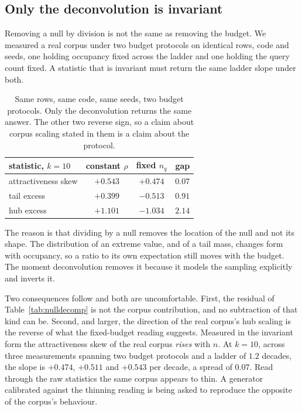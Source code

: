 \documentclass[11pt]{article}
\begin{document}
\subsection{Only the deconvolution is invariant}\label{sec:invariance}

Removing a null by division is not the same as removing the budget. We
measured a real corpus under two budget protocols on identical rows, code and
seeds, one holding occupancy fixed across the ladder and one holding the
query count fixed. A statistic that is invariant must return the same ladder
slope under both.

\begin{table}[t]
\centering
\small
\begin{tabular}{lccc}
\toprule
statistic, $k=10$ & constant $\rho$ & fixed $n_q$ & gap \\
\midrule
attractiveness skew & $+0.543$ & $+0.474$ & $\mathbf{0.07}$ \\
tail excess & $+0.399$ & $-0.513$ & $0.91$ \\
hub excess & $+1.101$ & $-1.034$ & $2.14$ \\
\bottomrule
\end{tabular}
\caption{Same rows, same code, same seeds, two budget protocols. Only the
deconvolution returns the same answer. The other two reverse sign, so a claim
about corpus scaling stated in them is a claim about the protocol.}
\label{tab:invariance}
\end{table}

The reason is that dividing by a null removes the location of the null and
not its shape. The distribution of an extreme value, and of a tail mass,
changes form with occupancy, so a ratio to its own expectation still moves
with the budget. The moment deconvolution removes it because it models the
sampling explicitly and inverts it.

Two consequences follow and both are uncomfortable. First, the residual of
Table~\ref{tab:nulldecomp} is not the corpus contribution, and no
subtraction of that kind can be. Second, and larger, the direction of the
real corpus's hub scaling is the reverse of what the fixed-budget reading
suggests. Measured in the invariant form the attractiveness skew of the real
corpus \emph{rises} with $n$. At $k = 10$, across three measurements
spanning two budget protocols and a ladder of $1.2$ decades, the slope is
$+0.474$, $+0.511$ and $+0.543$ per decade, a spread of $0.07$. Read through
the raw statistics the same corpus appears to thin. A generator calibrated
against the thinning reading is being asked to reproduce the opposite of the
corpus's behaviour.
\end{document}
